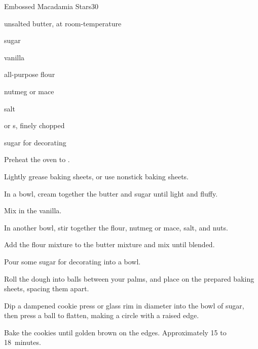 \begin{recipe}{Embossed Macadamia Stars}{}{30}

\begin{ingredients}
\item {} unsalted butter, at room-temperature
\item \C{\half} sugar
\item {} vanilla
\item {} all-purpose flour
\item \tp{\half} nutmeg or mace
\item \tp{\eighth} salt
\item \C{\half}  or s, finely chopped
\item sugar for decorating
\end{ingredients}

\begin{directions}
\item Preheat the oven to .
\item Lightly grease baking sheets, or use nonstick baking sheets.
\item In a bowl, cream together the butter and sugar until light and fluffy.
\item Mix in the vanilla.
\item In another bowl, stir together the flour, nutmeg or mace, salt, and nuts.
\item Add the flour mixture to the butter mixture and mix until blended.
\item Pour some sugar for decorating into a bowl.
\item Roll the dough into \inch{\threequarter} balls between your palms, and place on the prepared baking sheets, spacing them  apart.
\item Dip a dampened cookie press or glass rim \inch{2\quarter} in diameter into the bowl of sugar, then press a ball to flatten, making a circle with a raised edge.
\item Bake the cookies until golden brown on the edges. Approximately 15 to 18~minutes.
\end{directions}


\end{recipe}
